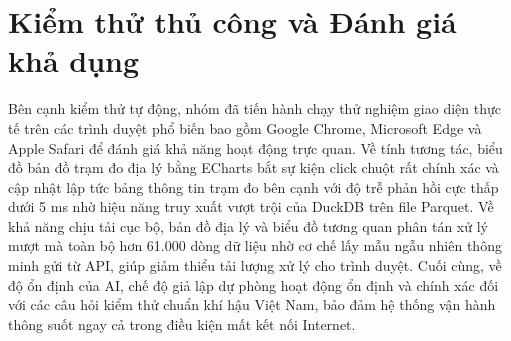 \section{Kiểm thử thủ công và Đánh giá khả dụng}
Bên cạnh kiểm thử tự động, nhóm đã tiến hành chạy thử nghiệm giao diện thực tế trên các trình duyệt phổ biến bao gồm Google Chrome, Microsoft Edge và Apple Safari để đánh giá khả năng hoạt động trực quan. Về tính tương tác, biểu đồ bản đồ trạm đo địa lý bằng ECharts bắt sự kiện click chuột rất chính xác và cập nhật lập tức bảng thông tin trạm đo bên cạnh với độ trễ phản hồi cực thấp dưới 5 ms nhờ hiệu năng truy xuất vượt trội của DuckDB trên file Parquet. Về khả năng chịu tải cục bộ, bản đồ địa lý và biểu đồ tương quan phân tán xử lý mượt mà toàn bộ hơn 61.000 dòng dữ liệu nhờ cơ chế lấy mẫu ngẫu nhiên thông minh gửi từ API, giúp giảm thiểu tải lượng xử lý cho trình duyệt. Cuối cùng, về độ ổn định của AI, chế độ giả lập dự phòng hoạt động ổn định và chính xác đối với các câu hỏi kiểm thử chuẩn khí hậu Việt Nam, bảo đảm hệ thống vận hành thông suốt ngay cả trong điều kiện mất kết nối Internet.

